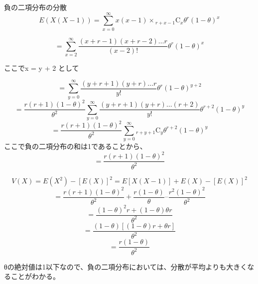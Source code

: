 \documentclass[]{article}
\begin{document}
負の二項分布の分散
\[ E(X(X-1)) = \sum_{x=0}^{\infty} x(x-1) \times {}_{r+x-1} \mathrm{C} _x \theta^r (1-\theta)^x \]

\[ = \sum_{x=2}^{\infty} \frac{(x+r-1)(x+r-2)\dots r}{(x-2)!} \theta^r (1-\theta)^x \]

ここでx = y + 2 として

\[ = \sum_{y=0}^{\infty} \frac{(y+r+1)(y+r)\dots r}{y!} \theta^r (1-\theta)^{y+2} \]
\[ = \frac{r(r+1)(1-\theta)^2}{\theta^2} \sum_{y=0}^{\infty} \frac{(y+r+1)(y+r)\dots (r+2)}{y!} \theta^{r+2} (1-\theta)^{y} \]
\[ = \frac{r(r+1)(1-\theta)^2}{\theta^2} \sum_{y=0}^{\infty} {}_{r+y+1} \mathrm{C} _{y} \theta^{r+2} (1-\theta)^y \]
ここで負の二項分布の和は1であることから、
\[ = \frac{r(r+1)(1-\theta)^2}{\theta^2} \]

\[V(X)=E(X^2)-[ E(X) ]^2 =E[X(X-1)] + E(X) -[ E(X) ]^2 \]
\[ = \frac{r(r+1)(1-\theta)^2}{\theta^2} + \frac{r(1-\theta)}{\theta} – \frac{r^2(1-\theta)^2}{\theta^2} \]
\[ = \frac{(1-\theta)^2r + (1-\theta)\theta r}{\theta^2} \]
\[ = \frac{(1-\theta)\left[ (1-\theta)r + \theta r \right]}{\theta^2} \]
\[ = \frac{r(1-\theta)}{\theta^2} \]

θの絶対値は1以下なので、負の二項分布においては、分散が平均よりも大きくなることがわかる。
\end{document}
